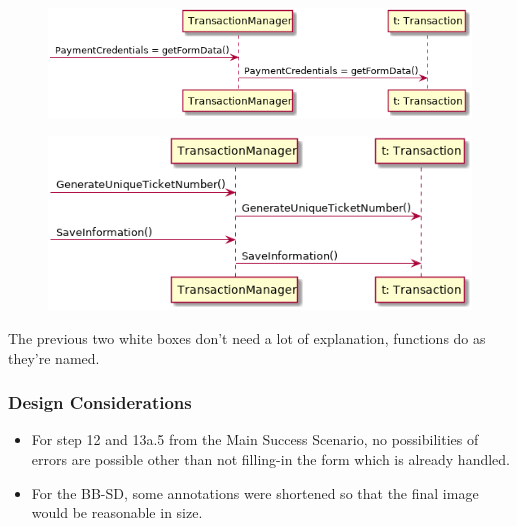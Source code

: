 \begin{figure}[H]
\includegraphics[scale=0.8]{Iteration_3/Files/UC1_wb4.png}
\end{figure}
\begin{figure}[H]
\includegraphics[scale=0.8]{Iteration_3/Files/UC1_wb5.png}
\end{figure}
The previous two white boxes don't need a lot of explanation, functions do as they're named.

\subsubsection{Design Considerations}
\begin{itemize}
    \item For step 12 and 13a.5 from the Main Success Scenario, no possibilities of errors are possible other than not filling-in the form which is already handled.
    \item For the BB-SD, some annotations were shortened so that the final image would be reasonable in size.
\end{itemize}